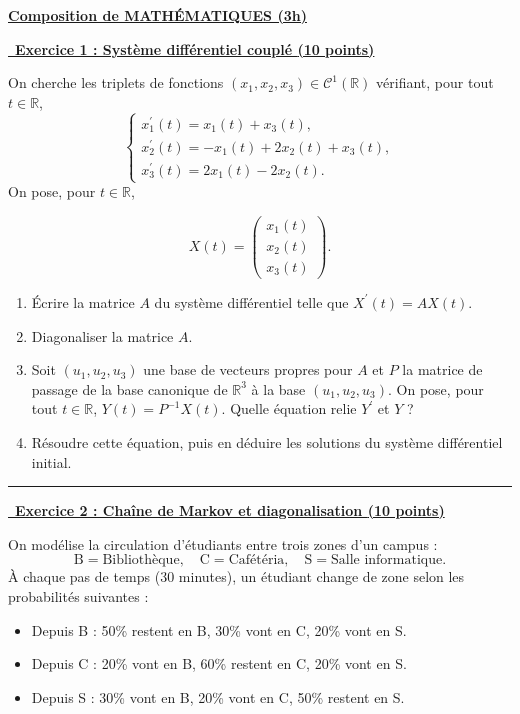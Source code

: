 \documentclass[a4paper,11pt]{article}
\begin{document}
\begin{center}\bf {\Large\underline{Composition de MATHÉMATIQUES  (3h)}}\end{center}
\hfill\break

\vspace{2em}

\underline {\, \bf{Exercice 1 : Système différentiel couplé } \bf{(10 points)}}
\medskip

On cherche les triplets de fonctions $\left(x_1, x_2, x_3\right) \in \mathcal{C}^1(\mathbb{R})$ vérifiant, pour tout $t \in \mathbb{R}$,
\[
\left\{\begin{array}{l}
x_1^{\prime}(t)=x_1(t)+x_3(t), \\
x_2^{\prime}(t)=-x_1(t)+2 x_2(t)+x_3(t), \\
x_3^{\prime}(t)=2 x_1(t)-2 x_2(t).
\end{array}\right.
\]
On pose, pour $t \in \mathbb{R}$,

$$
X(t)=\left(\begin{array}{l}
x_1(t) \\
x_2(t) \\
x_3(t)
\end{array}\right) .
$$


\begin{enumerate}
    \item Écrire la matrice $A$ du système différentiel telle que $X^{\prime}(t)=A X(t)$.
    \item Diagonaliser la matrice $A$.
    \item Soit $\left(u_1, u_2, u_3\right)$ une base de vecteurs propres pour $A$ et $P$ la matrice de passage de la base canonique de $\mathbb{R}^3$ à la base $(u_1, u_2, u_3)$. On pose, pour tout $t \in \mathbb{R}$, $Y(t)=P^{-1} X(t)$. Quelle équation relie $Y^{\prime}$ et $Y$ ?
    \item Résoudre cette équation, puis en déduire les solutions du système différentiel initial.
\end{enumerate}

\hfill\break
\hrule
\hfill\break
\vspace{1em}

\underline {\, \bf{Exercice 2 : Chaîne de Markov et diagonalisation } \bf{(10 points)}}
\medskip

On modélise la circulation d'étudiants entre trois zones d'un campus :
\[
\text{B}=\text{Bibliothèque},\quad
\text{C}=\text{Cafétéria},\quad
\text{S}=\text{Salle informatique}.
\]
À chaque pas de temps (30 minutes), un étudiant change de zone selon les probabilités suivantes :
\begin{itemize}
    \item Depuis B : 50\% restent en B, 30\% vont en C, 20\% vont en S.
    \item Depuis C : 20\% vont en B, 60\% restent en C, 20\% vont en S.
    \item Depuis S : 30\% vont en B, 20\% vont en C, 50\% restent en S.
\end{itemize}
\end{document}
